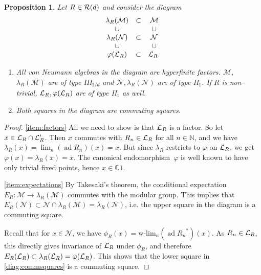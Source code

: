 \documentclass[12pt,a4paper]{amsart}
\numberwithin{equation}{section}
\newtheorem{proposition}[theorem]{Proposition}
\theoremstyle{remark}
\DeclareMathOperator{\ad}{ad}
\newcommand{\Cl}{\mathbb{C}}
\newcommand{\Nl}{\mathbb{N}}
\newcommand{\la}{\lambda}
\newcommand{\CM}[0]{\mathcal{M}} \newcommand{\CN}[0]{\mathcal{N}}
\begin{document}
\begin{proposition}\label{proposition:subfactor-diagram}
    Let $R\in\mathcal{R}(d)$ and consider the diagram
    \begin{equation}\label{diag:commsquares}
		\begin{array}{ccc}
            \la_R(\CM) &\subset & \CM 
            \\
            \cup && \cup
            \\
            \la_R(\CN) &\subset & \CN 
            \\
            \cup && \cup
            \\
            \varphi(\CL_R) &\subset & \CL_R .
		\end{array}
    \end{equation}
    \begin{enumerate}
     \item\label{item:factors} All von Neumann algebras in the diagram are hyperfinite factors. $\CM$, $\la_R(\CM)$ are of type III$_{1/d}$ and $\CN,\la_R(\CN)$ are of type II$_1$. If $R$ is non-trivial, $\mathcal{L}_R,\varphi(\mathcal{L}_R)$ are of type II$_1$ as well.
     \item\label{item:expectations} Both squares in the diagram are commuting squares.
    \end{enumerate}
\end{proposition}
\begin{proof}
    \ref{item:factors} All we need to show is that $\mathcal{L}_R$ is a factor. So let $x\in\mathcal{L}_R\cap\mathcal{L}_R'$. Then $x$ commutes with $R_n\in\mathcal{L}_R$ for all $n\in\Nl$, and we have $\la_R(x)=\lim_n(\ad R_n)(x)=x$. But since $\la_R$ restricts to $\varphi$ on $\mathcal{L}_R$, we get $\varphi(x)=\la_R(x)=x$. The canonical endomorphism~$\varphi$ is well known to have only trivial fixed points, hence $x\in\Cl1$.

    \ref{item:expectations} By Takesaki's theorem, the conditional expectation $E_R:\CM\to\la_R(\CM)$ commutes with the modular group. This implies that $E_R(\CN)\subset\CN\cap\la_R(\CM)=\la_R(\CN)$, i.e. the upper square in the diagram is a commuting square.
        
    Recall that for $x\in\CN$, we have $\phi_R(x)=\text{w-lim}_n(\ad {R_n}^*)(x)$. As $R_n\in\mathcal{L}_R$, this directly gives invariance of $\mathcal{L}_R$ under $\phi_R$, and therefore $E_R(\CL_R)\subset\la_R(\CL_R)=\varphi(\CL_R)$. This shows that the lower square in \eqref{diag:commsquares} is a commuting square.
\end{proof}
\end{document}
